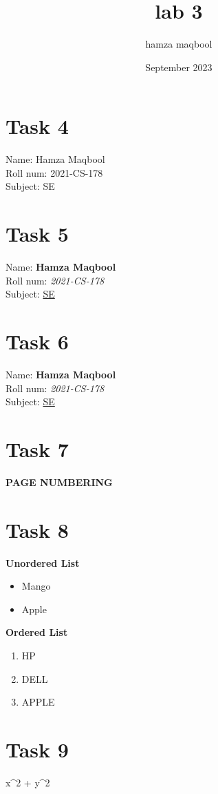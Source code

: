 \documentclass{article}
\title{lab 3}
\author{hamza maqbool}
\date{September 2023}
\begin{document}
\maketitle

\section{Task 4}
Name: Hamza Maqbool \\
Roll num: 2021-CS-178 \\
Subject: SE\\

\section{Task 5}
Name: \textbf {Hamza Maqbool} \\
Roll num: \textit{2021-CS-178} \\
Subject: \underline{SE}\\

\section{Task 6}
\textsf{Name: \textbf {Hamza Maqbool} \\
Roll num: \textit{2021-CS-178} \\
Subject: \underline{SE}\\}

\section{Task 7}
 \textbf {PAGE NUMBERING} \\

\section{Task 8}
 \textbf {Unordered List}
 \begin{itemize}
  \item Mango
  \item Apple
\end{itemize}

 \textbf {Ordered List}
 \begin{enumerate}
     \item HP
     \item DELL
     \item APPLE
 \end{enumerate}


\section{Task 9}
x^2 + y^2
\end{document}
